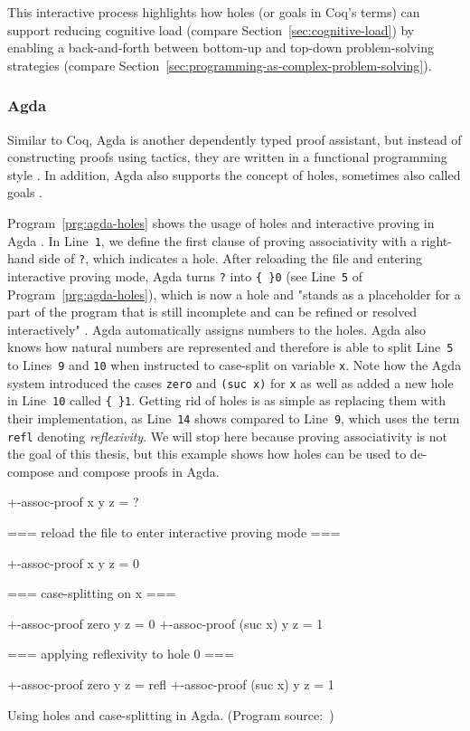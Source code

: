 This interactive process highlights how holes (or goals in Coq's terms) can support reducing cognitive load (compare Section~\ref{sec:cognitive-load}) by enabling a back-and-forth between bottom-up and top-down problem-solving strategies (compare Section~\ref{sec:programming-as-complex-problem-solving}).

\subsubsection{Agda}
Similar to Coq, Agda is another dependently typed proof assistant, but instead of constructing proofs using tactics, they are written in a functional programming style \cite{knispel_agda_2020}.
In addition, Agda also supports the concept of holes, sometimes also called goals \cite{the_agda_team_holes_2023}.

Program~\ref{prg:agda-holes} shows the usage of holes and interactive proving in Agda \cite{the_agda_team_holes_2023}.
In Line~\verb|1|, we define the first clause of proving associativity with a right-hand side of \verb|?|, which indicates a hole.
After reloading the file and entering interactive proving mode, Agda turns \verb|?| into \verb|{ }0| (see Line~\verb|5| of Program~\ref{prg:agda-holes}), which is now a hole and "stands as a placeholder for a part of the program that is still incomplete and can be refined or resolved interactively" \cite{the_agda_team_holes_2023}.
Agda automatically assigns numbers to the holes.
Agda also knows how natural numbers are represented and therefore is able to split Line~\verb|5| to Lines~\verb|9| and \verb|10| when instructed to case-split on variable \verb|x|.
Note how the Agda system introduced the cases \verb|zero| and \verb|(suc x)| for \verb|x| as well as added a new hole in Line~\verb|10| called \verb|{ }1|.
Getting rid of holes is as simple as replacing them with their implementation, as Line~\verb|14| shows compared to Line~\verb|9|, which uses the term \verb|refl| denoting \emph{reflexivity}.
We will stop here because proving associativity is not the goal of this thesis, but this example shows how holes can be used to de-compose and compose proofs in Agda.

\begin{program}[ht]
\begin{GenericCode}
+-assoc-proof x y z = ?

=== reload the file to enter interactive proving mode ===

+-assoc-proof x y z = { }0

=== case-splitting on x ===

+-assoc-proof zero y z = {  }0
+-assoc-proof (suc x) y z = {  }1

=== applying reflexivity to hole 0 ===

+-assoc-proof zero y z = refl
+-assoc-proof (suc x) y z = {  }1
\end{GenericCode}
\caption{Using holes and case-splitting in Agda. (Program source:~\cite{the_agda_team_holes_2023})}
\label{prg:agda-holes}
\end{program}

